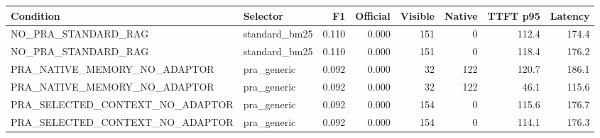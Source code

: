 \begin{tabular}{llrrrrrr}
\toprule
Condition & Selector & F1 & Official & Visible & Native & TTFT p95 & Latency \\
\midrule
NO\_PRA\_STANDARD\_RAG & standard\_bm25 & 0.110 & 0.000 & 151 & 0 & 112.4 & 174.4 \\
NO\_PRA\_STANDARD\_RAG & standard\_bm25 & 0.110 & 0.000 & 151 & 0 & 118.4 & 176.2 \\
PRA\_NATIVE\_MEMORY\_NO\_ADAPTOR & pra\_generic & 0.092 & 0.000 & 32 & 122 & 120.7 & 186.1 \\
PRA\_NATIVE\_MEMORY\_NO\_ADAPTOR & pra\_generic & 0.092 & 0.000 & 32 & 122 & 46.1 & 115.6 \\
PRA\_SELECTED\_CONTEXT\_NO\_ADAPTOR & pra\_generic & 0.092 & 0.000 & 154 & 0 & 115.6 & 176.7 \\
PRA\_SELECTED\_CONTEXT\_NO\_ADAPTOR & pra\_generic & 0.092 & 0.000 & 154 & 0 & 114.1 & 176.3 \\
\bottomrule
\end{tabular}
